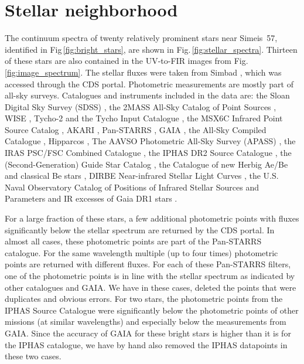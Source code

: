 \documentclass{aa}
\begin{document}
\section{Stellar neighborhood}
\par The continuum spectra of twenty relatively prominent stars near
Simeis~57, identified in Fig\,\ref{fig:bright_stars}, are shown in
Fig.\,\ref{fig:stellar_spectra}. Thirteen of these stars are also
contained in the UV-to-FIR images from
Fig.\,\ref{fig:image_spectrum}. The stellar fluxes were taken from
Simbad \citep{simbad2000}, which was accessed through the CDS portal.
Photometric measurements are mostly part of all-sky surveys. 
Catalogues and instruments included in the data are: the Sloan Digital Sky Survey
(SDSS)
\citep{Aguado2019}, the 2MASS All-Sky Catalog of Point Sources
\citep{Cutri2003}, WISE \citep{Wright2010,Jarrett2011}, Tycho-2 and the
Tycho Input Catalogue \cite{Pickles2010,Egret1992A,Ofek2008}, the MSX6C
Infrared Point Source Catalog \citep{Egan2003}, AKARI
\citep{Takita2010}, Pan-STARRS \citep{Magnier2013}, GAIA
\citep{gaiamission,gaia_data}, the  All-Sky Compiled Catalogue 
\citep{Kharchenko2009}, Hipparcos \citep{Perryman1997}, The AAVSO
Photometric All-Sky Survey (APASS) \citep{Henden2009}, the IRAS PSC/FSC
Combined Catalogue \citep{Abrahamyan2015A}, the IPHAS DR2 Source
Catalogue \citep{Barentsen2014}, the (Second-Generation) Guide Star
Catalog \citep{Lasker2008}, the Catalogue of new Herbig Ae/Be and
classical Be stars \citep{Vioque2020}, DIRBE Near-infrared Stellar Light
Curves \citep{Price2010ApJS..190..203P}, the U.S. Naval Observatory
Catalog of Positions of Infrared Stellar Sources
\citep{Hindsley1994AJ....107..280H} and Parameters and IR excesses of
Gaia DR1 stars \citep{McDonald2017MNRAS.471..770M}. 
\par For a large fraction of these stars, a few additional photometric
points with fluxes significantly below the stellar spectrum are
returned by the CDS portal. In almost all cases, these photometric
points are part of the Pan-STARRS catalogue. For the same wavelength
multiple (up to four times) photometric points are returned with
different fluxes. For each of these Pan-STARRS filters, one of the
photometric points is in line with
the stellar spectrum as indicated by other catalogues and GAIA. We have
in these cases, deleted the points that were duplicates and 
obvious errors. For two stars, the photometric points from the
IPHAS Source Catalogue were significantly below the photometric points
of other missions (at similar wavelengths) and especially below the
measurements from GAIA. Since the accuracy of GAIA for these bright
stars is higher than it is for the IPHAS catalogue, we have by hand also
removed the IPHAS datapoints in these two cases. 
\end{document}
